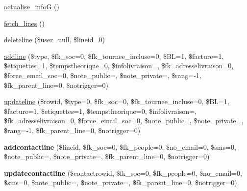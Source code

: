 \begin{DoxyCompactItemize}
\item 
\hyperlink{classTourneeGeneric_a3fc9031d22ff4fb9a9e1707780f670b6}{actualise\+\_\+infoG} ()
\item 
\hyperlink{classTourneeGeneric_adc718dcdaf08e4f883cab901d88286e8}{fetch\+\_\+lines} ()
\item 
\hyperlink{classTourneeGeneric_a011b211a5a70aac1d8bd559d0db8bf7f}{deleteline} (\$user=null, \$lineid=0)
\item 
\hyperlink{classTourneeGeneric_a677b4ec88b34669b307441d9c068ca1c}{addline} (\$type, \$fk\+\_\+soc=0, \$fk\+\_\+tournee\+\_\+incluse=0, \$BL=1, \$facture=1, \$etiquettes=1, \$tempstheorique=0, \$infolivraison=\textquotesingle{}\textquotesingle{}, \$fk\+\_\+adresselivraison=0, \$force\+\_\+email\+\_\+soc=0, \$note\+\_\+public=\textquotesingle{}\textquotesingle{}, \$note\+\_\+private=\textquotesingle{}\textquotesingle{}, \$rang=-\/1, \$fk\+\_\+parent\+\_\+line=0, \$notrigger=0)
\item 
\hyperlink{classTourneeGeneric_ad74c7f751188c8020857aac6b20d8a8f}{updateline} (\$rowid, \$type=0, \$fk\+\_\+soc=0, \$fk\+\_\+tournee\+\_\+incluse=0, \$BL=1, \$facture=1, \$etiquettes=1, \$tempstheorique=0, \$infolivraison=\textquotesingle{}\textquotesingle{}, \$fk\+\_\+adresselivraison=0, \$force\+\_\+email\+\_\+soc=0, \$note\+\_\+public=\textquotesingle{}\textquotesingle{}, \$note\+\_\+private=\textquotesingle{}\textquotesingle{}, \$rang=-\/1, \$fk\+\_\+parent\+\_\+line=0, \$notrigger=0)
\item 
\mbox{\label{classTourneeGeneric_a7a5f1c5670260e48bd2684c682553d87}} 
{\bfseries addcontactline} (\$lineid, \$fk\+\_\+soc=0, \$fk\+\_\+people=0, \$no\+\_\+email=0, \$sms=0, \$note\+\_\+public=\textquotesingle{}\textquotesingle{}, \$note\+\_\+private=\textquotesingle{}\textquotesingle{}, \$fk\+\_\+parent\+\_\+line=0, \$notrigger=0)
\item 
\mbox{\label{classTourneeGeneric_afb0339c6db7b9ebc5e9ddac1b4c71705}} 
{\bfseries updatecontactline} (\$contactrowid, \$fk\+\_\+soc=0, \$fk\+\_\+people=0, \$no\+\_\+email=0, \$sms=0, \$note\+\_\+public=\textquotesingle{}\textquotesingle{}, \$note\+\_\+private=\textquotesingle{}\textquotesingle{}, \$fk\+\_\+parent\+\_\+line=0, \$notrigger=0)
\item 
\mbox{\label{classTourneeGeneric_aeb51187de4861989bef62e4a185f539c}} 

\end{DoxyCompactItemize}
